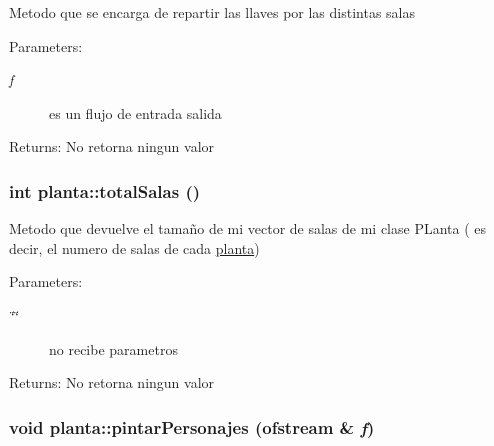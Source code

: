 Metodo que se encarga de repartir las llaves por las distintas salas \begin{Desc}
\item[Parameters:]
\begin{description}
\item[{\em f}]es un flujo de entrada salida \end{description}
\end{Desc}
\begin{Desc}
\item[Returns:]No retorna ningun valor \end{Desc}
\hypertarget{classplanta_9d424f5bb63dbae72f7f3ed6906d7095}{
\subsubsection[totalSalas]{\setlength{\rightskip}{0pt plus 5cm}int planta::totalSalas ()}}
\label{classplanta_9d424f5bb63dbae72f7f3ed6906d7095}


Metodo que devuelve el tamaño de mi vector de salas de mi clase PLanta ( es decir, el numero de salas de cada \hyperlink{classplanta}{planta}) \begin{Desc}
\item[Parameters:]
\begin{description}
\item[{\em \char`\"{}\char`\"{}}]no recibe parametros \end{description}
\end{Desc}
\begin{Desc}
\item[Returns:]No retorna ningun valor \end{Desc}
\hypertarget{classplanta_40ec013e3c503f0675c688c5dce3828a}{
\subsubsection[pintarPersonajes]{\setlength{\rightskip}{0pt plus 5cm}void planta::pintarPersonajes (ofstream \& {\em f})}}
\label{classplanta_40ec013e3c503f0675c688c5dce3828a}


